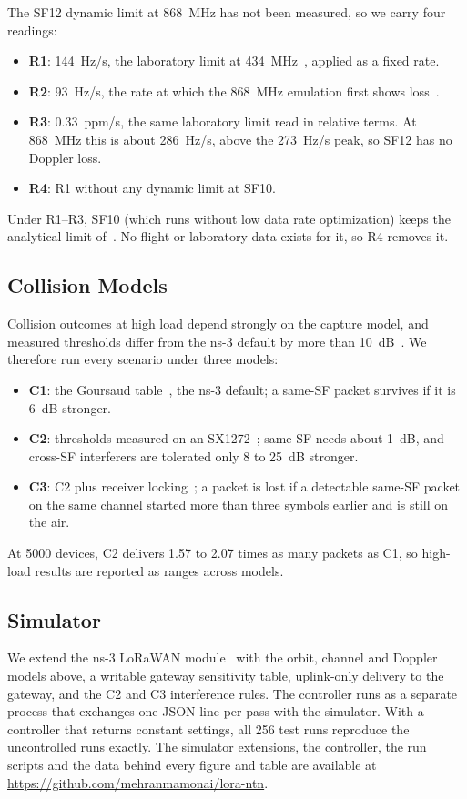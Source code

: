 \documentclass[journal]{IEEEtran}
\begin{document}
The SF12 dynamic limit at 868~MHz has not been measured, so we carry four readings:
\begin{itemize}
\item \textbf{R1}: 144~Hz/s, the laboratory limit at 434~MHz~\cite{doroshkin2019}, applied as a fixed rate.
\item \textbf{R2}: 93~Hz/s, the rate at which the 868~MHz emulation first shows loss~\cite{colombo2022}.
\item \textbf{R3}: 0.33~ppm/s, the same laboratory limit read in relative terms. At 868~MHz this is about 286~Hz/s, above the 273~Hz/s peak, so SF12 has no Doppler loss.
\item \textbf{R4}: R1 without any dynamic limit at SF10.
\end{itemize}
Under R1--R3, SF10 (which runs without low data rate optimization) keeps the analytical limit of~\cite{asadullah2024}. No flight or laboratory data exists for it, so R4 removes it.

\subsection{Collision Models}
Collision outcomes at high load depend strongly on the capture model, and measured thresholds differ from the ns-3 default by more than 10~dB~\cite{croce2018}. We therefore run every scenario under three models:
\begin{itemize}
\item \textbf{C1}: the Goursaud table~\cite{goursaud2015}, the ns-3 default; a same-SF packet survives if it is 6~dB stronger.
\item \textbf{C2}: thresholds measured on an SX1272~\cite{croce2018}; same SF needs about 1~dB, and cross-SF interferers are tolerated only 8 to 25~dB stronger.
\item \textbf{C3}: C2 plus receiver locking~\cite{bor2016,rahmadhani2018}; a packet is lost if a detectable same-SF packet on the same channel started more than three symbols earlier and is still on the air.
\end{itemize}
At 5000 devices, C2 delivers 1.57 to 2.07 times as many packets as C1, so high-load results are reported as ranges across models.

\subsection{Simulator}
We extend the ns-3 LoRaWAN module~\cite{ns3lorawan} with the orbit, channel and Doppler models above, a writable gateway sensitivity table, uplink-only delivery to the gateway, and the C2 and C3 interference rules. The controller runs as a separate process that exchanges one JSON line per pass with the simulator. With a controller that returns constant settings, all 256 test runs reproduce the uncontrolled runs exactly. The simulator extensions, the controller, the run scripts and the data behind every figure and table are available at \url{https://github.com/mehranmamonai/lora-ntn}.
\end{document}
